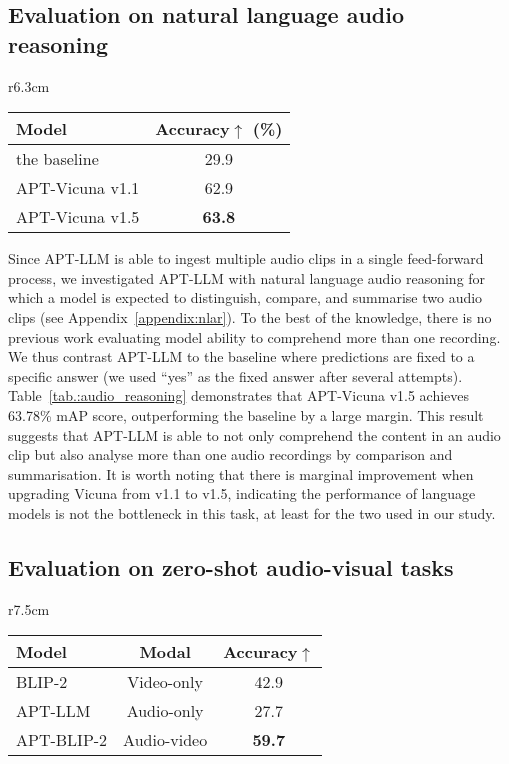 \documentclass{article} %
\begin{document}
\subsection{Evaluation on natural language audio reasoning} \label{subsec:evaluation_on_nlar}
\begin{wraptable}{r}{6.3cm}
    \caption{Benchmarking APT on the natural language audio reasoning task.}
    \label{tab.:audio_reasoning}
    \begin{tabular}{lc}
    \toprule
    Model               & Accuracy$\uparrow$ (\%)         \\ \hline
    the baseline        & 29.9              \\
    APT-Vicuna v1.1 & 62.9              \\
    APT-Vicuna v1.5 & \textbf{63.8}     \\ \bottomrule
    \end{tabular}
\end{wraptable}

Since APT-LLM is able to ingest multiple audio clips in a single feed-forward process, we investigated APT-LLM with natural language audio reasoning for which a model is expected to distinguish, compare, and summarise two audio clips (see Appendix~\ref{appendix:nlar}). To the best of the knowledge, there is no previous work evaluating model ability to comprehend more than one recording. We thus contrast APT-LLM to the baseline where predictions are fixed to a specific answer (we used ``yes'' as the fixed answer after several attempts). Table~\ref{tab.:audio_reasoning} demonstrates that APT-Vicuna v1.5 achieves 63.78\% mAP score, outperforming the baseline by a large margin. This result suggests that APT-LLM is able to not only comprehend the content in an audio clip but also analyse more than one audio recordings by comparison and summarisation. It is worth noting that there is marginal improvement when upgrading Vicuna from v1.1 to v1.5, indicating the performance of language models is not the bottleneck in this task, at least for the two used in our study.

\subsection{Evaluation on zero-shot audio-visual tasks} \label{subsec:evaluation_on_audio-visual_tasks}

\begin{wraptable}{r}{7.5cm}
    \caption{Performance comparison between different modalities in audio-visual learning.}
    \label{tab.:av_learning}
    \begin{tabular}{@{}lcc@{}}
    \toprule
    Model                         & Modal       & Accuracy$\uparrow$         \\ \midrule
    BLIP-2~\citep{li_blip-2_2023} & Video-only  & 42.9             \\
    APT-LLM             & Audio-only  & 27.7                  \\
    APT-BLIP-2                  & Audio-video & \textbf{59.7}    \\ \bottomrule
    \end{tabular}
\end{wraptable}
\end{document}
